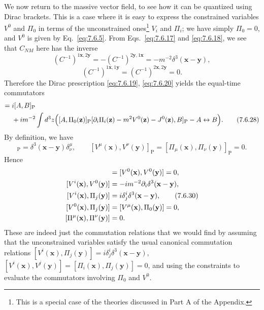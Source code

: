 We now return to the massive vector field, to see how it can be quantized
using Dirac brackets. This is a case where it is easy to express the
constrained variables $V^0$ and $\Pi_0$ in terms of the unconstrained
ones\footnote{This is a special case of the theories discussed in Part A of
the Appendix.} $V_i$ and $\Pi_i$; we have simply $\Pi_0=0$, and $V^0$ is
given by Eq.~\eqref{eq:7.6.5}. From Eqs.~\eqref{eq:7.6.17} and \eqref{eq:7.6.18}, we see that $C_{NM}$
here has the inverse
\begin{equation}
(C^{-1})^{1\mathbf x,2\mathbf y}
=-(C^{-1})^{2\mathbf y,1\mathbf x}
=-m^{-2}\delta^3(\mathbf x-\mathbf y),
\tag{7.6.26}\label{eq:7.6.26}
\end{equation}
\begin{equation}
(C^{-1})^{1\mathbf x,1\mathbf y}
=(C^{-1})^{2\mathbf x,2\mathbf y}=0.
\tag{7.6.27}\label{eq:7.6.27}
\end{equation}
Therefore the Dirac prescription \eqref{eq:7.6.19}, \eqref{eq:7.6.20} yields the equal-time
commutators
\begin{align}
[A,B]={}&i[A,B]_{\mathrm P}\notag\\
&+im^{-2}\int d^3z\Bigl(
[A,\Pi_0(\mathbf z)]_{\mathrm P}
[\partial_i\Pi_i(\mathbf z)-m^2V^0(\mathbf z)-J^0(\mathbf z),B]_{\mathrm P}
-A\leftrightarrow B\Bigr).
\tag{7.6.28}\label{eq:7.6.28}
\end{align}
By definition, we have
\begin{equation}
[V^\mu(\mathbf x),\Pi_\nu(\mathbf y)]_{\mathrm P}
=\delta^3(\mathbf x-\mathbf y)\delta^\mu_\nu,
\qquad
[V^\mu(\mathbf x),V^\nu(\mathbf y)]_{\mathrm P}
=[\Pi_\mu(\mathbf x),\Pi_\nu(\mathbf y)]_{\mathrm P}=0.
\tag{7.6.29}\label{eq:7.6.29}
\end{equation}
Hence
\begin{align}
[V^i(\mathbf x),V^j(\mathbf y)]&=[V^0(\mathbf x),V^0(\mathbf y)]=0,
\notag\\
[V^i(\mathbf x),V^0(\mathbf y)]&=-im^{-2}\partial_i\delta^3(\mathbf x-\mathbf y),
\notag\\
[V^i(\mathbf x),\Pi_j(\mathbf y)]&=i\delta^i_j\delta^3(\mathbf x-\mathbf y),
\tag{7.6.30}\label{eq:7.6.30}\\
[V^0(\mathbf x),\Pi_j(\mathbf y)]&=[V^\mu(\mathbf x),\Pi_0(\mathbf y)]=0,
\notag\\
[\Pi^\mu(\mathbf x),\Pi^\nu(\mathbf y)]&=0.
\notag
\end{align}
These are indeed just the commutation relations that we would find by
assuming that the unconstrained variables satisfy the usual canonical
commutation relations
$[V^i(\mathbf x),\Pi_j(\mathbf y)]=i\delta^i_j\delta^3(\mathbf x-\mathbf y)$,
$[V^i(\mathbf x),V^j(\mathbf y)]=[\Pi_i(\mathbf x),\Pi_j(\mathbf y)]=0$,
and using the constraints to evaluate the commutators involving $\Pi_0$ and
$V^0$.
